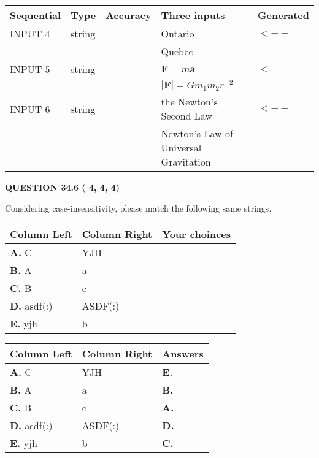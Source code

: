 \documentclass[12pt]{article}
\begin{document}
   
  
  
\noindent\begin{tabular}{|l|l|l|l|l|}
\hline
 Sequential & Type & Accuracy & Three inputs & Generated \\ 
\hline
 
 
  INPUT $           4$ & string & & 
 Ontario & 
  $ <-- $ 
  \\
  & & & 
 Quebec & 
 \\  \hline  
 
 
  INPUT $           5$ & string & & 
 $\mathbf{F}=m\mathbf{a}$ & 
  $ <-- $ 
  \\
  & & & 
 $\left| \mathbf{F}\right| =Gm_1m_2r^{-2}$ & 
 \\  \hline  
 
 
  INPUT $           6$ & string & & 
 the Newton's Second Law & 
  $ <-- $ 
  \\
  & & & 
 Newton's Law of Universal Gravitation & 
 \\  \hline  
 \end{tabular}
   
   
  
\vspace{0.2in}
  
{\textbf{\Large{QUESTION
34.6 
 (          4,          4,          4)
}}}
  
  
Considering case-insensitivity, please match the following same strings.
  
  
\begin{tabular}{|l|l|l|}
 \hline
 Column Left & Column Right  & Your choinces \\ 
 \hline
{\textbf{\large{
A.}}}
C
  & 
YJH
 & 
 \\ 
 \hline
{\textbf{\large{
B.}}}
A
  & 
a
 & 
 \\ 
 \hline
{\textbf{\large{
C.}}}
B
  & 
c
 & 
 \\ 
 \hline
{\textbf{\large{
D.}}}
asdf(:)
  & 
ASDF(:)
 & 
 \\ 
 \hline
{\textbf{\large{
E.}}}
yjh
  & 
b
 & 
 \\ 
 \hline
 \end{tabular}
  
  
 
 
\noindent{}
  
  
\begin{tabular}{|l|l|l|}
 \hline
 Column Left & Column Right  & Answers       \\ 
 \hline
{\textbf{\large{
A.}}}
C
  & 
YJH
 & 
{\textbf{\large{
E.}}}
 \\ 
 \hline
{\textbf{\large{
B.}}}
A
  & 
a
 & 
{\textbf{\large{
B.}}}
 \\ 
 \hline
{\textbf{\large{
C.}}}
B
  & 
c
 & 
{\textbf{\large{
A.}}}
 \\ 
 \hline
{\textbf{\large{
D.}}}
asdf(:)
  & 
ASDF(:)
 & 
{\textbf{\large{
D.}}}
 \\ 
 \hline
{\textbf{\large{
E.}}}
yjh
  & 
b
 & 
{\textbf{\large{
C.}}}
 \\ 
 \hline
 \end{tabular}
  
\end{document}
